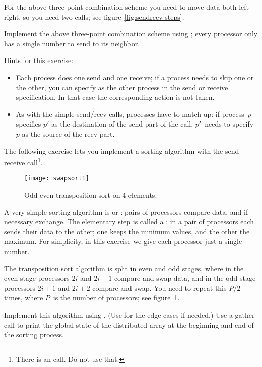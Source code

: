 For the above three-point combination scheme you need to move data
both left right, so you need two  calls;
see figure~\ref{fig:sendrecv-steps}.

\begin{exercise}
  \label{ex:3ptsendrecv}
  Implement the above three-point combination scheme using ;
  every processor only has a single number to send to its neighbor.
\end{exercise}

Hints for this exercise:
\begin{itemize}
\item Each process does one send and one receive; if a process needs
  to skip one or the other, you can specify
   as the other process in the send or
  receive specification. In that case the corresponding action
  is not taken.
\item As with the simple send/recv calls, processes have to match up:
  if process~$p$ specifies $p'$ as the destination of the send part of
  the call, $p'$~needs to specify $p$ as the source of the recv part.
\end{itemize}

The following exercise lets you implement a sorting algorithm with the
send-receive call\footnote {There is an 
  call. Do not use that.}.

\begin{figure}[ht]
  \texttt{[image: swapsort1]}
  \caption{Odd-even transposition sort on 4 elements.}
  \label{fig:swapsort1}
\end{figure}

\begin{exercise}
  \label{ex:exchangesort}
  A very simple sorting algorithm is  or
  :
  pairs of processors compare data, and if necessary exchange. The
  elementary step is called a : in a pair
  of processors each sends their data to the other; one keeps the
  minimum values, and the other the maximum.
  For simplicity, in this exercise we give each processor just a single number.

  The transposition sort algorithm is split in even and odd stages, where
  in the even stage processors $2i$ and $2i+1$ compare and swap data,
  and in the odd stage processors $2i+1$ and $2i+2$ compare and swap.
  You need to repeat this $P/2$ times, where $P$~is the number of
  processors; see figure~\ref{fig:swapsort1}.

  Implement this algorithm using . (Use
   for the edge cases if needed.)
  Use a gather call to print the global state of the distributed array
  at the beginning and end of the sorting process.
\end{exercise}

